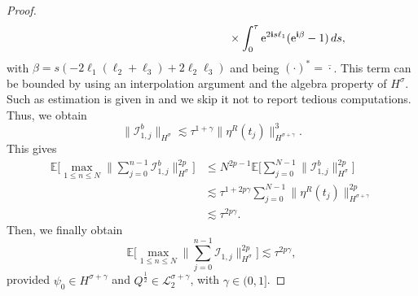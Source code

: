 \documentclass[a4paper]{amsart}
\begin{document}
\begin{proof}
\begin{align*}
    &\hspace{5cm}\times \int_0^\tau {\rm e}^{2{\bf i}s \ell_1}({\rm e}^{{\bf i}\beta}-1)\,ds,
        \end{align*}
    with $\beta=s(-2\ell_1(\ell_2+\ell_3)+2\ell_2\ell_3)$ and being $(\cdot)^*=\overline{\cdot}$. This term can be bounded by using an interpolation argument and the algebra property of $H^\sigma$. Such as estimation is given in \cite{os_ka} and we skip it not to report tedious computations.
    Thus, we obtain
    $$
    \|\mathcal{I}_{1,j}^b\|_{H^\sigma}\lesssim \tau^{1+\gamma}\|\eta^R(t_j)\|^3_{H^{\sigma+\gamma}}.
    $$
    This gives
    \begin{align*}
    \mathbb{E}\big[\max_{1\le n\le N} \|\sum_{j=0}^{n-1}\mathcal{I}_{1,j}^b\|^{2p}_{H^\sigma}\big]&\le N^{2p-1}
    \mathbb{E}\big[\sum_{j=0}^{N-1}\|\mathcal{I}_{1,j}^b\|^{2p}_{H^\sigma}\big]\\
    &\lesssim \tau^{1+2p\gamma}\sum_{j=0}^{N-1}\|\eta^R(t_j)\|^{2p}_{H^{\sigma+\gamma}}\\
    &\lesssim \tau^{2p\gamma}.
     \end{align*}
    Then, we finally obtain
    $$
    \mathbb{E}\big[\max_{1\le n\le N} \|\sum_{j=0}^{n-1}\mathcal{I}_{1,j}\|^{2p}_{H^\sigma}\big]\lesssim \tau^{2p\gamma},
    $$
    provided $\psi_0\in H^{\sigma+\gamma}$ and $Q^{\frac{1}{2}}\in\mathcal{L}_2^{\sigma+\gamma}$, with $\gamma\in(0,1]$.


\end{proof}
\end{document}

